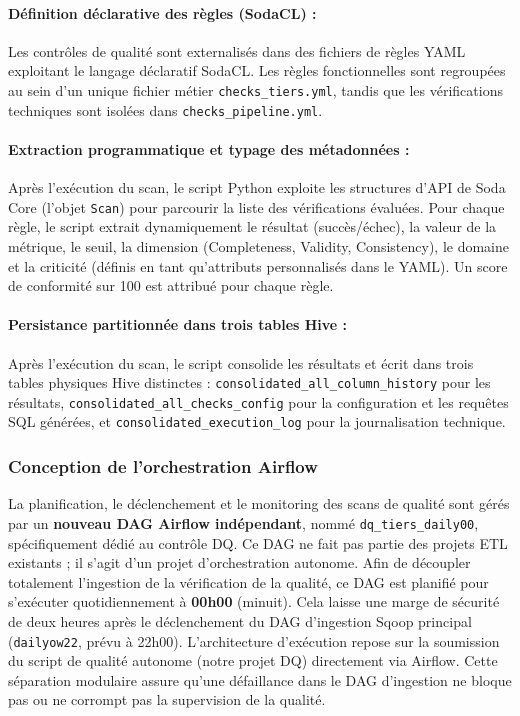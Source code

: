 \paragraph{Définition déclarative des règles (SodaCL) :} Les contrôles de qualité sont externalisés dans des fichiers de règles YAML exploitant le langage déclaratif SodaCL. Les règles fonctionnelles sont regroupées au sein d'un unique fichier métier \texttt{checks\_tiers.yml}, tandis que les vérifications techniques sont isolées dans \texttt{checks\_pipeline.yml}.

\paragraph{Extraction programmatique et typage des métadonnées :} Après l'exécution du scan, le script Python exploite les structures d'API de Soda Core (l'objet \texttt{Scan}) pour parcourir la liste des vérifications évaluées. Pour chaque règle, le script extrait dynamiquement le résultat (succès/échec), la valeur de la métrique, le seuil, la dimension (Completeness, Validity, Consistency), le domaine et la criticité (définis en tant qu'attributs personnalisés dans le YAML). Un score de conformité sur 100 est attribué pour chaque règle.

\paragraph{Persistance partitionnée dans trois tables Hive :} Après l'exécution du scan, le script consolide les résultats et écrit dans trois tables physiques Hive distinctes : \texttt{consolidated\allowbreak\_all\allowbreak\_column\allowbreak\_history} pour les résultats, \texttt{consolidated\allowbreak\_all\allowbreak\_checks\allowbreak\_config} pour la configuration et les requêtes SQL générées, et \texttt{consolidated\allowbreak\_execution\allowbreak\_log} pour la journalisation technique.

\subsubsection{Conception de l'orchestration Airflow}
La planification, le déclenchement et le monitoring des scans de qualité sont gérés par un \textbf{nouveau DAG Airflow indépendant}, nommé \texttt{dq\_tiers\_daily00}, spécifiquement dédié au contrôle DQ. Ce DAG ne fait pas partie des projets ETL existants ; il s'agit d'un projet d'orchestration autonome. Afin de découpler totalement l'ingestion de la vérification de la qualité, ce DAG est planifié pour s'exécuter quotidiennement à \textbf{00h00} (minuit). Cela laisse une marge de sécurité de deux heures après le déclenchement du DAG d'ingestion Sqoop principal (\texttt{dailyow22}, prévu à 22h00). L'architecture d'exécution repose sur la soumission du script de qualité autonome (notre projet DQ) directement via Airflow. Cette séparation modulaire assure qu'une défaillance dans le DAG d'ingestion ne bloque pas ou ne corrompt pas la supervision de la qualité.


